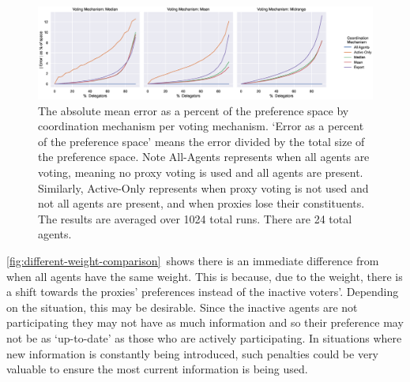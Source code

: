 \begin{landscape}
    \begin{figure}[p]
        \centering
        \includegraphics[scale=0.55]
        {content/chapter2/figures/vm_col_cm_hue_error_as_percent_of_space_abs_mean}
        \caption{
            The absolute mean error as a percent of the preference space by
            coordination mechanism per voting mechanism.
            `Error as a percent of the preference space' means the error divided by
            the total size of the preference space.
            Note All-Agents represents when all agents are voting, meaning no proxy
            voting is used and all agents are present.
            Similarly, Active-Only represents when proxy voting is not used and not
            all agents are present, and when proxies lose their constituents.
            The results are averaged over 1024 total runs.
            There are 24 total agents.
        }
        \label{fig:vm-col-cm-hue-error-as-percent-of-space-abs-mean}
    \end{figure}
\end{landscape}

\autoref{fig:different-weight-comparison}~shows there is an immediate difference from
when all agents have the same weight.
This is because, due to the weight, there is a shift towards the proxies' preferences
instead of the inactive voters'.
Depending on the situation, this may be desirable.
Since the inactive agents are not participating they may not have as much information
and so their preference may not be as `up-to-date' as those who are actively
participating.
In situations where new information is constantly being introduced, such penalties
could be very valuable to ensure the most current information is being used.

